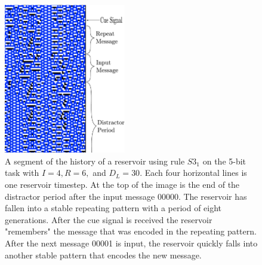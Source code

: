 \documentclass{elsarticle}
\begin{document}
\begin{multicols}{2}
	
        \begin{figure}[H]
		\centering
                \includegraphics[width=0.475\textwidth]{RepeatMessage.pdf}
		\caption{A segment of the history of a reservoir using rule $S3_{1}$ on the 
			5-bit task with $I=4, R=6,$ and $D_{L}=30$. Each four horizontal lines is one 
			reservoir timestep. At the top of the image is the end of the distractor 
			period after the input message 00000. The reservoir has fallen into a 
			stable repeating pattern with a period of eight generations. After the 
                        cue signal is received the reservoir "remembers" the 
                        message that was encoded in the repeating pattern. 
                        After the next message 00001 is input, the reservoir 
                        quickly falls into another stable pattern that encodes 
                        the new message.} 
		
		\label{repeat}
	\end{figure}


\end{multicols}
\end{document}
